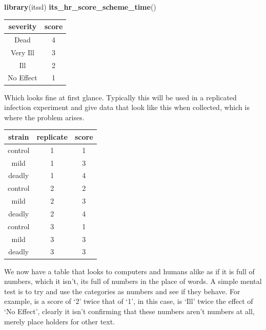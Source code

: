 \documentclass[
]{book}
\newenvironment{Shaded}{\begin{snugshade}}{\end{snugshade}}
\newcommand{\KeywordTok}[1]{\textcolor[rgb]{0.13,0.29,0.53}{\textbf{#1}}}
\newcommand{\NormalTok}[1]{#1}
\newcommand{\OperatorTok}[1]{\textcolor[rgb]{0.81,0.36,0.00}{\textbf{#1}}}
\newcommand{\StringTok}[1]{\textcolor[rgb]{0.31,0.60,0.02}{#1}}
\begin{document}
\begin{Shaded}
\begin{Highlighting}[]
\KeywordTok{library}\NormalTok{(itssl)}
\KeywordTok{its_hr_score_scheme_time}\NormalTok{()}
\end{Highlighting}
\end{Shaded}

\begin{tabular}{c|c}
\hline
severity & score\\
\hline
Dead & 4\\
\hline
Very Ill & 3\\
\hline
Ill & 2\\
\hline
No Effect & 1\\
\hline
\end{tabular}

Which looks fine at first glance. Typically this will be used in a replicated infection experiment and give data that look like this when collected, which is where the problem arises.

\begin{Shaded}
\end{Shaded}

\begin{tabular}{c|c|c}
\hline
strain & replicate & score\\
\hline
control & 1 & 1\\
\hline
mild & 1 & 3\\
\hline
deadly & 1 & 4\\
\hline
control & 2 & 2\\
\hline
mild & 2 & 3\\
\hline
deadly & 2 & 4\\
\hline
control & 3 & 1\\
\hline
mild & 3 & 3\\
\hline
deadly & 3 & 3\\
\hline
\end{tabular}

We now have a table that looks to computers and humans alike as if it is full of numbers, which it isn't, its full of numbers in the place of words. A simple mental test is to try and use the categories as numbers and see if they behave. For example, is a score of `2' twice that of `1', in this case, is `Ill' twice the effect of `No Effect', clearly it isn't confirming that these numbers aren't numbers at all, merely place holders for other text.
\end{document}
